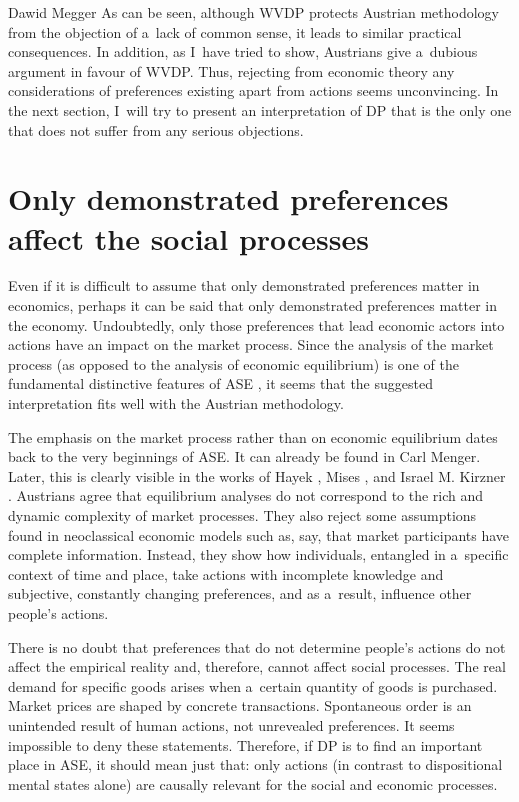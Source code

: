 \begin{artengenv}{Dawid Megger}
As can be seen, although WVDP protects Austrian methodology from the objection of a~lack of common sense, it leads to similar practical consequences. In addition, as I~have tried to show, Austrians give a~dubious argument in favour of WVDP. Thus, rejecting from economic theory any considerations of preferences existing apart from actions seems unconvincing. In the next section, I~will try to present an interpretation of DP that is the only one that does not suffer from any serious objections.



\section{Only demonstrated preferences affect the social processes}

Even if it is difficult to assume that only demonstrated preferences matter in economics, perhaps it can be said that only demonstrated preferences matter in the economy. Undoubtedly, only those preferences that lead economic actors into actions have an impact on the market process. Since the analysis of the market process (as opposed to the analysis of economic equilibrium) is one of the fundamental distinctive features of ASE 
\parencites[][]{rothbard_present_2011}[][]{coyne_austrian_2015}, %
 it seems that the suggested interpretation fits well with the Austrian methodology.



The emphasis on the market process rather than on economic equilibrium dates back to the very beginnings of ASE. It can already be found in Carl Menger. Later, this is clearly visible in the works of Hayek 
\parencite*[][]{hayek_use_1945}, %
 Mises 
\parencite*[][]{mises_human_1998}, %
 and Israel M. Kirzner 
\parencite*[][]{kirzner_competition_1973}. %
 Austrians agree that equilibrium analyses do not correspond to the rich and dynamic complexity of market processes. They also reject some assumptions found in neoclassical economic models such as, say, that market participants have complete information. Instead, they show how individuals, entangled in a~specific context of time and place, take actions with incomplete knowledge and subjective, constantly changing preferences, and as a~result, influence other people's actions.



There is no doubt that preferences that do not determine people's actions do not affect the empirical reality and, therefore, cannot affect social processes. The real demand for specific goods arises when a~certain quantity of goods is purchased. Market prices are shaped by concrete transactions. Spontaneous order is an unintended result of human actions, not unrevealed preferences. It seems impossible to deny these statements. Therefore, if DP is to find an important place in ASE, it should mean just that: only actions (in contrast to dispositional mental states alone) are causally relevant for the social and economic processes.




\end{artengenv}
